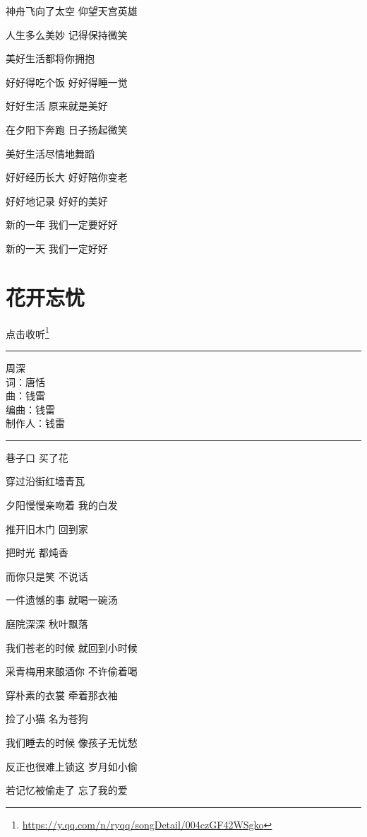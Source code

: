 \documentclass[]{ctexbook}
\renewcommand{\href}[2]{#2\footnote{\url{#1}}}
\begin{document}
神舟飞向了太空 仰望天宫英雄

人生多么美妙 记得保持微笑

美好生活都将你拥抱

好好得吃个饭 好好得睡一觉

好好生活 原来就是美好

在夕阳下奔跑 日子扬起微笑

美好生活尽情地舞蹈

好好经历长大 好好陪你变老

好好地记录 好好的美好

新的一年 我们一定要好好

新的一天 我们一定好好

\section*{花开忘忧}\label{no-worries}


\href{https://y.qq.com/n/ryqq/songDetail/004czGF42WSgko}{点击收听}

\begin{center}\rule{0.5\linewidth}{0.5pt}\end{center}

周深\\
词：唐恬\\
曲：钱雷\\
编曲：钱雷\\
制作人：钱雷

\begin{center}\rule{0.5\linewidth}{0.5pt}\end{center}

巷子口 买了花

穿过沿街红墙青瓦

夕阳慢慢亲吻着 我的白发

推开旧木门 回到家

把时光 都炖香

而你只是笑 不说话

一件遗憾的事 就喝一碗汤

庭院深深 秋叶飘落

我们苍老的时候 就回到小时候

采青梅用来酿酒你 不许偷着喝

穿朴素的衣裳 牵着那衣袖

捡了小猫 名为苍狗

我们睡去的时候 像孩子无忧愁

反正也很难上锁这 岁月如小偷

若记忆被偷走了 忘了我的爱
\end{document}

